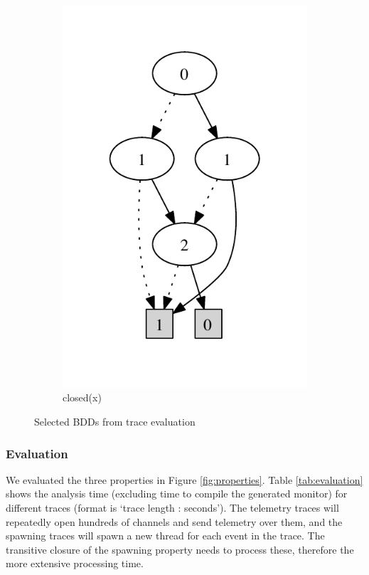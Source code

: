 \begin{figure}
\begin{subfigure}[b]{0.15\textwidth}
        \includegraphics[width=\textwidth]{figures/bdd3.pdf}
        \caption{closed(x)}
        \label{fig:bdd3}
    \end{subfigure}
    \caption{Selected BDDs from trace evaluation}
    \label{fig:bdds}
\end{figure}

\subsubsection{Evaluation}

We evaluated the three properties in Figure 
\ref{fig:properties}. Table \ref{tab:evaluation} shows the  
analysis time (excluding time to compile the generated 
monitor) for different traces (format is `trace length : seconds'). The telemetry traces will repeatedly open hundreds of channels and send telemetry over them, and the spawning traces will spawn a new thread for each event in the trace. The transitive closure of the spawning property needs to process these, therefore the more extensive processing time.

